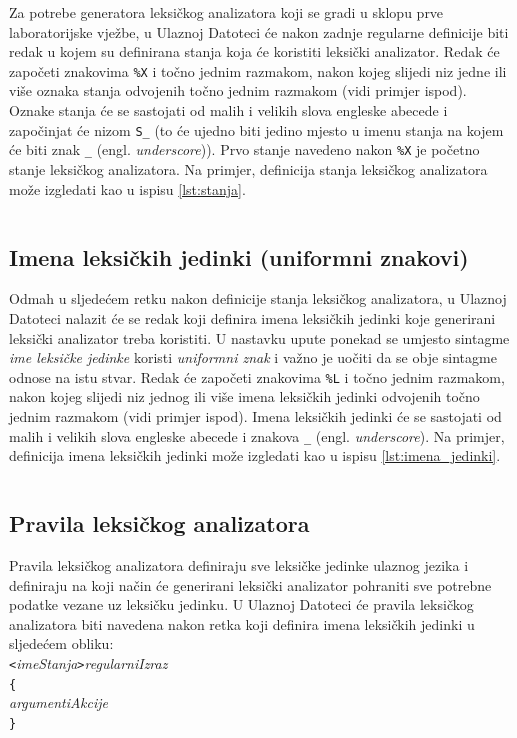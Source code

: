 \documentclass[times, 12pt, utf8]{book}
\begin{document}
Za potrebe generatora leksičkog analizatora koji se gradi u sklopu prve laboratorijske vježbe, u Ulaznoj Datoteci će nakon zadnje regularne definicije biti redak u kojem su definirana stanja koja će koristiti leksički analizator.
Redak će započeti znakovima \verb=%X= i točno jednim razmakom, nakon kojeg slijedi niz jedne ili više oznaka stanja odvojenih točno jednim razmakom (vidi primjer ispod).
Oznake stanja će se sastojati od malih i velikih slova engleske abecede i započinjat će nizom \verb=S_= (to će ujedno biti jedino mjesto u imenu stanja na kojem će biti znak \verb=_= (engl. \emph{underscore})).
Prvo stanje navedeno nakon \verb=%X= je početno stanje leksičkog analizatora.
Na primjer, definicija stanja leksičkog analizatora može izgledati kao u ispisu \ref{lst:stanja}.

\begin{lstlisting}[caption={Primjer imena stanja u Ulaznoj Datoteci.},label=lst:stanja]
%X S_pocetno S_komentar S_unarniMinus
\end{lstlisting}

\subsection{Imena leksičkih jedinki (uniformni znakovi)}
Odmah u sljedećem retku nakon definicije stanja leksičkog analizatora, u Ulaznoj Datoteci nalazit će se redak koji definira imena leksičkih jedinki koje generirani leksički analizator treba koristiti.
U nastavku upute ponekad se umjesto sintagme \emph{ime leksičke jedinke} koristi \emph{uniformni znak} i važno je uočiti da se obje sintagme odnose na istu stvar.
Redak će započeti znakovima \verb=%L= i točno jednim razmakom, nakon kojeg slijedi niz jednog ili više imena leksičkih jedinki odvojenih točno jednim razmakom (vidi primjer ispod).
Imena leksičkih jedinki će se sastojati od malih i velikih slova engleske abecede i znakova \verb=_= (engl. \emph{underscore}).
Na primjer, definicija imena leksičkih jedinki može izgledati kao u ispisu \ref{lst:imena_jedinki}.

\begin{lstlisting}[caption={Primjer imena stanja u Ulaznoj Datoteci.},label=lst:imena_jedinki]
%L IDENTIFIKATOR brojcanaKonstanta znakovnaKonstanta OP_PLUS
\end{lstlisting}

\subsection{Pravila leksičkog analizatora}
Pravila leksičkog analizatora definiraju sve leksičke jedinke ulaznog jezika i definiraju na koji način će generirani leksički analizator pohraniti sve potrebne podatke vezane uz leksičku jedinku.
U Ulaznoj Datoteci će pravila leksičkog analizatora biti navedena nakon retka koji definira imena leksičkih jedinki u sljedećem obliku:\\
\verb=<=\emph{imeStanja}\verb=>=\emph{regularniIzraz}\\
\verb|{|\\
\emph{argumentiAkcije}\\
\verb|}|
\end{document}
